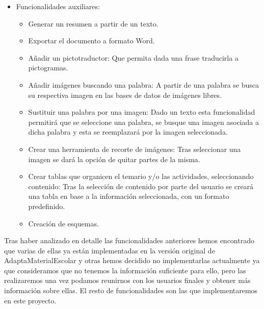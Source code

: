 \begin{itemize}
  \item Funcionalidades auxiliares:
  \begin{itemize}
    \item Generar un resumen a partir de un texto.
    \item Exportar el documento a formato Word.
    \item Añadir un pictotraductor: Que permita dada una frase traducirla a pictogramas.
    \item Añadir imágenes buscando una palabra: A partir de una palabra se busca su respectiva imagen en las bases de datos de imágenes libres.
    \item Sustituir una palabra por una imagen: Dado un texto esta funcionalidad permitirá que se seleccione una palabra, se busque una imagen asociada a dicha palabra y esta se reemplazará por la imagen seleccionada.
    \item Crear una herramienta de recorte de imágenes: Tras seleccionar una imagen se dará la opción de quitar partes de la misma. 
    \item Crear tablas que organicen el temario y/o las actividades, seleccionando contenido: Tras la selección de contenido por parte del usuario se creará una tabla en base a la información seleccionada, con un formato predefinido.
    \item Creación de esquemas.
  \end{itemize}

\end{itemize} 


Tras haber analizado en detalle las funcionalidades anteriores hemos encontrado que varias de ellas ya están implementadas en la versión original de AdaptaMaterialEscolar y otras hemos decidido no implementarlas actualmente ya que consideramos que no tenemos la información suficiente para ello, pero las realizaremos una vez podamos reunirnos con los usuarios finales y obtener más información sobre ellas. El resto de funcionalidades son las que implementaremos en este proyecto.

